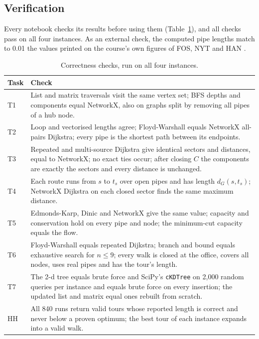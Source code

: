 \subsection{Verification}
Every notebook checks its results before using them (Table~\ref{tab:checks}), and all checks pass on all four instances. As an external check, the computed pipe lengths match to 0.01 the values printed on the course's own figures of FOS, NYT and HAN \citep{narvaez_slides}.

\begin{table}[H]
\centering\small
\caption{Correctness checks, run on all four instances.}\label{tab:checks}
\begin{tabular}{lp{13.2cm}}
\toprule
Task & Check \\
\midrule
T1 & List and matrix traversals visit the same vertex set; BFS depths and components equal NetworkX, also on graphs split by removing all pipes of a hub node. \\
T2 & Loop and vectorised lengths agree; Floyd-Warshall equals NetworkX all-pairs Dijkstra; every pipe is the shortest path between its endpoints. \\
T3 & Repeated and multi-source Dijkstra give identical sectors and distances, equal to NetworkX; no exact ties occur; after closing $C$ the components are exactly the sectors and every distance is unchanged. \\
T4 & Each route runs from $s$ to $t_s$ over open pipes and has length $d_G(s,t_s)$; NetworkX Dijkstra on each closed sector finds the same maximum distance. \\
T5 & Edmonds-Karp, Dinic and NetworkX give the same value; capacity and conservation hold on every pipe and node; the minimum-cut capacity equals the flow. \\
T6 & Floyd-Warshall equals repeated Dijkstra; branch and bound equals exhaustive search for $n\le9$; every walk is closed at the office, covers all nodes, uses real pipes and has the tour's length. \\
T7 & The 2-d tree equals brute force and SciPy's \texttt{cKDTree} on 2,000 random queries per instance and equals brute force on every insertion; the updated list and matrix equal ones rebuilt from scratch. \\
HH & All 840 runs return valid tours whose reported length is correct and never below a proven optimum; the best tour of each instance expands into a valid walk. \\
\bottomrule
\end{tabular}
\end{table}
